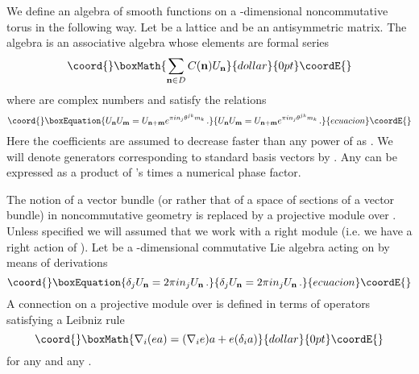 \documentclass[a4paper,a4paper]{article}
\begin{document}
We define an algebra \coordHE{} of smooth functions on a \coordHE{}-dimensional 
noncommutative torus in the following way. Let \coordHE{} 
be a lattice \coordHE{} and \coordHE{} be an antisymmetric 
\coordHE{} matrix. The algebra \coordHE{} is an associative algebra 
whose elements are formal series 
$$\coord{}\boxMath{
\sum_{{\bf n}\in D} C({\bf n})U_{\bf n}
}{dollar}{0pt}\coordE{}$$ 
where \coordHE{} are complex numbers and \coordHE{} satisfy the relations 
\begin{equation}\coord{}\boxEquation{ \label{nct}
U_{\bf n}U_{\bf m}=U_{\bf n + m }e^{\pi i n_{j}\theta^{jk}m_{k}} \, .
}{ U_{\bf n}U_{\bf m}=U_{\bf n + m }e^{\pi i n_{j}\theta^{jk}m_{k}} \, .
}{ecuacion}\coordE{}\end{equation}
Here the coefficients \coordHE{} are assumed to decrease faster than 
any power of \coordHE{} as \coordHE{}. We will denote 
generators corresponding to standard basis vectors 
\coordHE{} by \coordHE{}. Any \coordHE{} can be 
expressed as a product of \coordHE{}'s times a numerical phase factor.   

The notion of a vector bundle (or rather that of a space of sections of 
a vector bundle) in noncommutative geometry is replaced by a projective module 
over \coordHE{}. Unless specified we will assumed that we work with a 
right module (i.e. we have a right action of \coordHE{}). 
Let \coordHE{} be a \coordHE{}-dimensional commutative Lie algebra acting 
on \coordHE{} by means of derivations
\begin{equation}\coord{}\boxEquation{
\delta_{j} U_{\bf n} = 2\pi i n_{j} U_{\bf n} \, .
}{
\delta_{j} U_{\bf n} = 2\pi i n_{j} U_{\bf n} \, .
}{ecuacion}\coordE{}\end{equation} 
A connection  on a projective module \coordHE{} over \coordHE{} 
is defined in terms of operators \coordHE{} satisfying 
a Leibniz rule 
$$\coord{}\boxMath{
\nabla_{i}(ea) = (\nabla_{i}e)a + e(\delta_{i}a)
}{dollar}{0pt}\coordE{}$$ 
for any \coordHE{}  and any \coordHE{}. 
\end{document}
